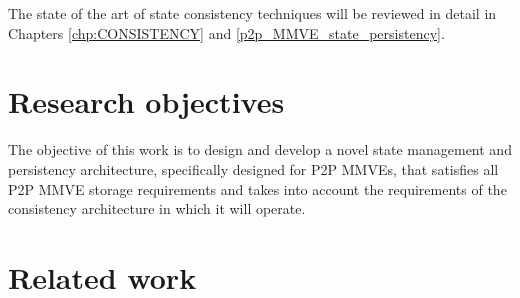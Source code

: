 The state of the art of state consistency techniques will be reviewed in detail in Chapters \ref{chp:CONSISTENCY} and \ref{p2p_MMVE_state_persistency}.

\section{Research objectives}

The objective of this work is to design and develop a novel state management and persistency architecture, specifically designed for P2P MMVEs, that satisfies all P2P MMVE storage requirements and takes into account the requirements of the consistency architecture in which it will operate.

\section{Related work}








